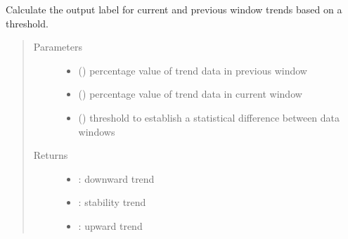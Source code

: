 \documentclass[letterpaper,10pt,english]{sphinxmanual}
\begin{document}
\begin{fulllineitems}
\label{\detokenize{algorithms:algorithms.eti.eti_utils.calc_label_trend}}
\sphinxAtStartPar
Calculate the output label for current and previous window trends based on a threshold.
\begin{quote}\begin{description}
\item[{Parameters}] \leavevmode\begin{itemize}
\item {} 
\sphinxAtStartPar
{} () \textendash{} percentage value of trend data in previous window

\item {} 
\sphinxAtStartPar
{} () \textendash{} percentage value of trend data in current window

\item {} 
\sphinxAtStartPar
{} () \textendash{} threshold to establish a statistical difference between data windows

\end{itemize}

\item[{Returns}] \leavevmode
\sphinxAtStartPar
\begin{itemize}
\item {} 
: downward trend

\item {} 
: stability trend

\item {} 
: upward trend

\end{itemize}


\end{description}\end{quote}

\end{fulllineitems}
\end{document}
